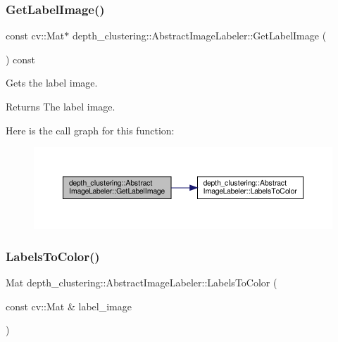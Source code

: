 \subsubsection{\texorpdfstring{Get\+Label\+Image()}{GetLabelImage()}}
{\footnotesize\ttfamily const cv\+::\+Mat$\ast$ depth\+\_\+clustering\+::\+Abstract\+Image\+Labeler\+::\+Get\+Label\+Image (\begin{DoxyParamCaption}{ }\end{DoxyParamCaption}) const\hspace{0.3cm}{\ttfamily [inline]}}



Gets the label image. 

\begin{DoxyReturn}{Returns}
The label image. 
\end{DoxyReturn}
Here is the call graph for this function\+:\nopagebreak
\begin{figure}[H]
\begin{center}
\leavevmode
\includegraphics[width=350pt]{classdepth__clustering_1_1AbstractImageLabeler_a7b2f8edf44f3ccb01fb71c296241615e_cgraph}
\end{center}
\end{figure}
\mbox{\label{classdepth__clustering_1_1AbstractImageLabeler_abab18e0c1ca40b54922a2f21948b996b}} 
\subsubsection{\texorpdfstring{Labels\+To\+Color()}{LabelsToColor()}}
{\footnotesize\ttfamily Mat depth\+\_\+clustering\+::\+Abstract\+Image\+Labeler\+::\+Labels\+To\+Color (\begin{DoxyParamCaption}\item[{const cv\+::\+Mat \&}]{label\+\_\+image }\end{DoxyParamCaption})\hspace{0.3cm}{\ttfamily [static]}}



